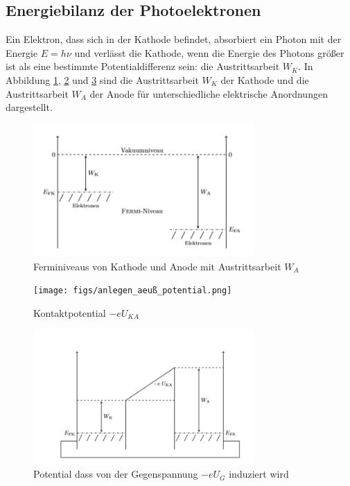 
\subsection{Energiebilanz der Photoelektronen}
Ein Elektron, dass sich in der Kathode befindet, absorbiert ein Photon mit der Energie $E = h\nu$ und verlässt die Kathode, wenn die Energie des Photons größer ist als eine bestimmte Potentialdifferenz sein: die Austrittsarbeit $W_K$.
In Abbildung \ref{fig:kathode-anode}, \ref{fig:potential ext} und \ref{fig:potential kurzg.} sind die Austrittsarbeit $W_K$ der Kathode und die Austrittsarbeit $W_A$ der Anode für unterschiedliche elektrische Anordnungen dargestellt.\\ %


\begin{figure}[htbp]
    \centering
    \includegraphics[width=0.75\textwidth]{figs/baenderschema_kathode_anode.png}
    \caption{ Ferminiveaus von Kathode und Anode mit Austrittsarbeit $W_A$ \cite{praktikum}}
    \label{fig:kathode-anode}
\end{figure}
\FloatBarrier

\begin{figure}[htbp]
    \centering
    \texttt{[image: figs/anlegen\_aeuß\_potential.png]}
    \caption{ Kontaktpotential $-eU_{KA}$ \cite{praktikum}}
    \label{fig:potential ext}
\end{figure}
\FloatBarrier

\begin{figure}[htbp]
    \centering
    \includegraphics[width=0.75\textwidth]{figs/kontaktpotential_kurzgeschl_elektroden.png}
    \caption{  Potential dass von der Gegenspannung
$-eU_G$ induziert wird\cite{praktikum}}
    \label{fig:potential kurzg.}
\end{figure}
\FloatBarrier


